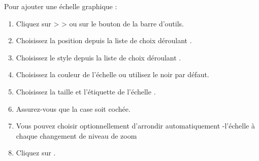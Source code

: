 Pour ajouter une \'echelle graphique :

\begin{enumerate}
\item Cliquez sur  >  >  ou sur le bouton   de la barre d'outils.
\item Choisissez la position depuis la liste de choix d\'eroulant .
\item Choisissez le style depuis la liste de choix d\'eroulant .
\item Choisissez la couleur de l'\'echelle  ou utilisez le noir par d\'efaut.
\item Choisissez la taille et l'\'etiquette de l'\'echelle .
\item Assurez-vous que la case  soit coch\'ee.
\item Vous pouvez choisir optionnellement d'arrondir automatiquement -l'\'echelle
 \`a chaque changement de niveau de zoom 
\item Cliquez sur .
\end{enumerate}

